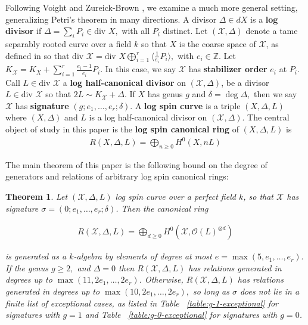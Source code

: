 \documentclass{amsart}
\theoremstyle{plain}
\newtheorem{thm}{Theorem}[section]
\theoremstyle{definition}
\theoremstyle{remark}
\numberwithin{equation}{section}
\newcommand\BZ{{\mathbb Z}}
\newcommand \sx{\mathscr X}
\newcommand\sco{{\mathscr O}}
\newcommand \di{\text{div }}
\newcommand \halfcan{L}
\begin{document}
Following Voight and Zureick-Brown \cite{vzb:stacky}, we examine a
much more general setting, generalizing Petri's theorem in many
directions. A divisor $\Delta \in d X$ is a {\bf log divisor} if
$\Delta = \sum_{i}^{}P_i \in \di X,$ with all $P_i$ distinct. Let
$(\sx,\Delta)$ denote a tame separably rooted curve over a
field $k$ so that $X$ is the coarse space of $\sx$, as defined in
\cite[Section 5.2]{vzb:stacky} so that $\di \sx = \di X \bigoplus_{i
= 1}^r \langle \frac{1}{e_i}P_i \rangle,$ with $e_i \in \BZ$. Let $K_
\sx = K_X + \sum_{i = 1}^{r}\frac{e_i - 1}{e_i}P_i.$ In this case, we
say $\sx$ has {\bf stabilizer order} $e_i$ at $P_i$. Call $\halfcan
\in \di \sx$ a {\bf log half-canonical divisor} on $(\sx,\Delta)$,
be a divisor $\halfcan \in \di \sx$ so that $2\halfcan \sim K_\sx +
\Delta.$ If $X$ has genus $g$ and $\delta = \deg \Delta,$ then we
say $\sx$ has \textbf{signature} $(g; e_1, \ldots, e_r;\delta)$. A
{\bf log spin curve} is a triple $(X,\Delta,\halfcan)$ where $(X,\Delta)$
and $\halfcan$ is a log half-canonical divisor on $(\sx,\Delta)$.
The central object of study in this paper is the {\bf log spin
canonical ring} of $(X,\Delta,L)$ is
\begin{align*}
	R(X,\Delta,L) = \bigoplus_{n \geq 0} H^0(X,nL)
\end{align*}

\noindent
The main theorem of this paper is the following bound on the degree
of generators and relations of arbitrary log spin canonical rings:

\begin{thm}
\label{thm:general_generators_relations}
Let $(\sx, \Delta, \halfcan)$ log spin curve over a perfect field $k$, so
that $\sx$ has signature $\sigma = (0; e_1, \ldots, e_r; \delta)$. Then the
canonical ring

\begin{align*}
	R(\sx, \Delta, \halfcan) = \bigoplus_{d \geq 0} H^0(\sx, \sco(L)^{\otimes d})
\end{align*}

\noindent
is generated as a $k$-algebra by elements of degree at most $e =
\max(5, e_1, \ldots, e_r).$ If the genus $g \geq 2,$ and $\Delta = 0
$ then $R(\sx,\Delta, \halfcan)$ has relations generated in degrees
up to $\max(11, 2e_1, \ldots, 2e_r)$. Otherwise, $R(\sx, \Delta,
\halfcan)$ has relations generated in degrees up to $\max(10, 2e_1,
\ldots, 2e_r),$ so long as $\sigma$ does not lie in a finite list
of exceptional cases, as listed in Table ~\ref{table:g-1-exceptional}
for signatures with $g = 1$ and Table ~\ref{table:g-0-exceptional}
for signatures with $g = 0$.
\end{thm}
\end{document}
